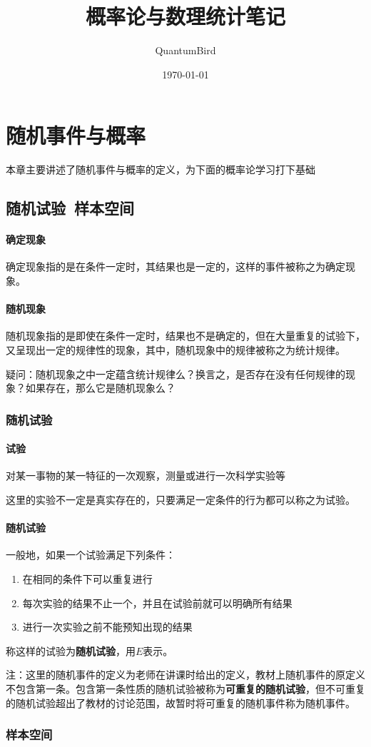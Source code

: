 \documentclass[UTF8]{ctexart}
\title{概率论与数理统计笔记}
\author{QuantumBird}
\date{\today}
\begin{document}
	\maketitle
	\tableofcontents
	\section{随机事件与概率}
	本章主要讲述了随机事件与概率的定义，为下面的概率论学习打下基础
	\subsection{随机试验\ 样本空间}
		\paragraph{确定现象}
		确定现象指的是在条件一定时，其结果也是一定的，这样的事件被称之为确定现象。
		\paragraph{随机现象}
		随机现象指的是即使在条件一定时，结果也不是确定的，但在大量重复的试验下，又呈现出一定的规律性的现象，其中，随机现象中的规律被称之为统计规律。

		疑问：随机现象之中一定蕴含统计规律么？换言之，是否存在没有任何规律的现象？如果存在，那么它是随机现象么？
		\subsubsection{随机试验}
		\paragraph{试验} 对某一事物的某一特征的一次观察，测量或进行一次科学实验等
		
		这里的实验不一定是真实存在的，只要满足一定条件的行为都可以称之为试验。
		\paragraph{随机试验}一般地，如果一个试验满足下列条件：
		\begin{enumerate}
			\item 在相同的条件下可以重复进行
			\item 每次实验的结果不止一个，并且在试验前就可以明确所有结果
			\item 进行一次实验之前不能预知出现的结果
		\end{enumerate}
		称这样的试验为\textbf{随机试验}，用$E$表示。
		
		注：这里的随机事件的定义为老师在讲课时给出的定义，教材上随机事件的原定义不包含第一条。包含第一条性质的随机试验被称为\textbf{可重复的随机试验}，但不可重复的随机试验超出了教材的讨论范围，故暂时将可重复的随机事件称为随机事件。
		\subsubsection{样本空间}
		
\end{document}
